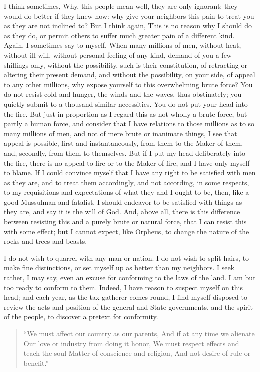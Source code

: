 \documentclass[letterpaper,12pt,english]{sphinxmanual}
\begin{document}
I think sometimes, Why, this people mean well, they are only ignorant; they would do better if they knew how: why give your neighbors this pain to treat you as they are not inclined to? But I think again, This is no reason why I should do as they do, or permit others to suffer much greater pain of a different kind. Again, I sometimes say to myself, When many millions of men, without heat, without ill will, without personal feeling of any kind, demand of you a few shillings only, without the possibility, such is their constitution, of retracting or altering their present demand, and without the possibility, on your side, of appeal to any other millions, why expose yourself to this overwhelming brute force? You do not resist cold and hunger, the winds and the waves, thus obstinately; you quietly submit to a thousand similar necessities. You do not put your head into the fire. But just in proportion as I regard this as not wholly a brute force, but partly a human force, and consider that I have relations to those millions as to so many millions of men, and not of mere brute or inanimate things, I see that appeal is possible, first and instantaneously, from them to the Maker of them, and, secondly, from them to themselves. But if I put my head deliberately into the fire, there is no appeal to fire or to the Maker of fire, and I have only myself to blame. If I could convince myself that I have any right to be satisfied with men as they are, and to treat them accordingly, and not according, in some respects, to my requisitions and expectations of what they and I ought to be, then, like a good Mussulman and fatalist, I should endeavor to be satisfied with things as they are, and say it is the will of God. And, above all, there is this difference between resisting this and a purely brute or natural force, that I can resist this with some effect; but I cannot expect, like Orpheus, to change the nature of the rocks and trees and beasts.

I do not wish to quarrel with any man or nation. I do not wish to split hairs, to make fine distinctions, or set myself up as better than my neighbors. I seek rather, I may say, even an excuse for conforming to the laws of the land. I am but too ready to conform to them. Indeed, I have reason to suspect myself on this head; and each year, as the tax-gatherer comes round, I find myself disposed to review the acts and position of the general and State governments, and the spirit of the people, to discover a pretext for conformity.
\begin{quote}

``We must affect our country as our parents,
And if at any time we alienate
Our love or industry from doing it honor,
We must respect effects and teach the soul
Matter of conscience and religion,
And not desire of rule or benefit.''
\end{quote}
\end{document}
